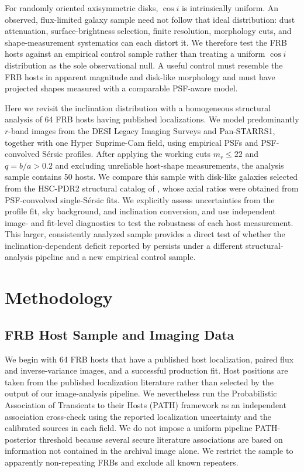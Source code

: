 \documentclass[10pt,twocolumn]{article}
\begin{document}
For randomly oriented axisymmetric disks, $\cos i$ is intrinsically uniform.
An observed, flux-limited galaxy sample need not follow that ideal
distribution: dust attenuation, surface-brightness selection, finite
resolution, morphology cuts, and shape-measurement systematics can each
distort it.  We therefore test the FRB hosts against an empirical control
sample rather than treating a uniform $\cos i$ distribution as the sole
observational null.  A useful control must resemble the FRB hosts in apparent
magnitude and disk-like morphology and must have projected shapes measured
with a comparable PSF-aware model.

Here we revisit the inclination distribution with a homogeneous structural
analysis of 64 FRB hosts having published localizations.  We model
predominantly $r$-band images from the DESI Legacy Imaging Surveys and
Pan-STARRS1, together with one Hyper Suprime-Cam field, using empirical PSFs
and PSF-convolved S\'ersic profiles.  After applying the working cuts
$m_r\leq22$ and $q=b/a>0.2$ and excluding unreliable host-shape measurements,
the analysis sample contains 50 hosts.  We compare this sample with disk-like
galaxies selected from the HSC-PDR2 structural catalog of
\citet{2021ApJ...921...38K}, whose axial ratios were obtained from
PSF-convolved single-S\'ersic fits.  We explicitly assess uncertainties from
the profile fit, sky background, and inclination conversion, and use
independent image- and fit-level diagnostics to test the robustness of each
host measurement.  This larger, consistently analyzed sample provides a
direct test of whether the inclination-dependent deficit reported by
\citet{2024Natur.634.1065B} persists under a different structural-analysis
pipeline and a new empirical control sample.


\section{Methodology}
\label{sec:methodology}

\subsection{FRB Host Sample and Imaging Data}
\label{subsec:sample_imaging}

We begin with 64 FRB hosts that have a published host localization, paired
flux and inverse-variance images, and a successful production fit.  Host
positions are taken from the published localization literature rather than
selected by the output of our image-analysis pipeline.  We nevertheless run
the Probabilistic Association of Transients to their Hosts (PATH) framework
\citep{Aggarwal2021} as an independent association cross-check using the
reported localization uncertainty and the calibrated sources in each field.
We do not impose a uniform pipeline PATH-posterior threshold because several
secure literature associations are based on information not contained in the
archival image alone.  We restrict the sample to apparently non-repeating
FRBs and exclude all known repeaters.
\end{document}
